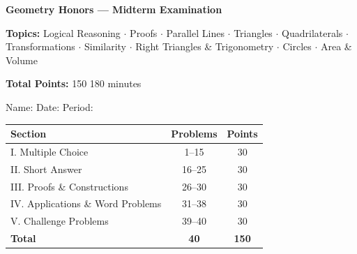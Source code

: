 \documentclass[12pt,addpoints]{exam}
\begin{document}
\begin{center}
\vspace*{1.5in}
{\Huge\bfseries Geometry Honors --- Midterm Examination\par}
\vspace{0.3in}

{\large\bfseries Topics:} Logical Reasoning $\cdot$ Proofs $\cdot$ Parallel Lines $\cdot$ Triangles $\cdot$ Quadrilaterals $\cdot$ Transformations $\cdot$ Similarity $\cdot$ Right Triangles \& Trigonometry $\cdot$ Circles $\cdot$ Area \& Volume

\vspace{0.2in}
{\large\bfseries Total Points:} 150  180 minutes 

\vspace{0.5in}
Name: \underline{\hspace{4cm}} \qquad Date: \underline{\hspace{3cm}} \qquad Period: \underline{\hspace{2cm}}
\end{center}

\vspace{0.4in}

\begin{center}
\end{center}

\vspace{0.3in}
\begin{center}
\begin{tabular}{|l|c|c|}
\hline
\textbf{Section} & \textbf{Problems} & \textbf{Points} \\ \hline
I. Multiple Choice & 1--15 & 30 \\ \hline
II. Short Answer & 16--25 & 30 \\ \hline
III. Proofs \& Constructions & 26--30 & 30 \\ \hline
IV. Applications \& Word Problems & 31--38 & 30 \\ \hline
V. Challenge Problems & 39--40 & 30 \\ \hline
\textbf{Total} & \textbf{40} & \textbf{150} \\ \hline
\end{tabular}
\end{center}
\end{document}
